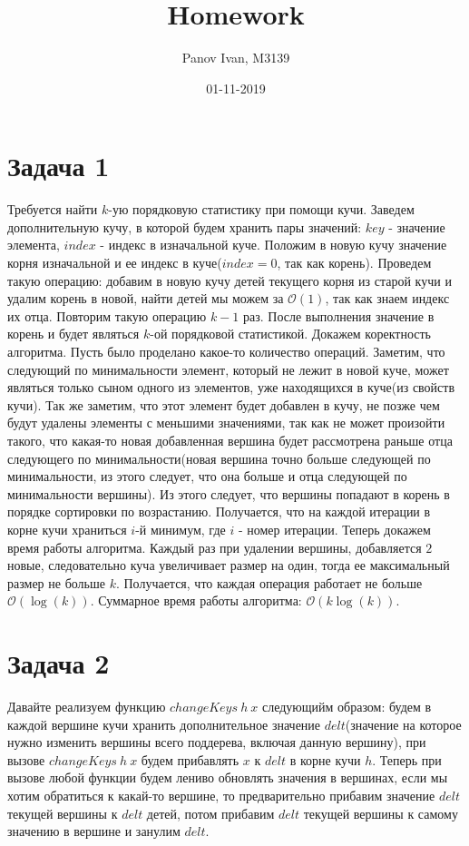 \documentclass{article}
\title{Homework}
\date{01-11-2019}
\author{Panov Ivan, M3139}
\begin{document}
	
	\maketitle
	\newpage
	
	\section*{Задача 1}
	Требуется найти $k$-ую порядковую статистику при помощи кучи. Заведем дополнительную кучу, в которой будем хранить пары значений: $key$ - значение элемента, $index$ - индекс в изначальной куче. Положим в новую кучу значение корня изначальной и ее индекс в куче($index = 0$, так как корень). Проведем такую операцию: добавим в новую кучу детей текущего корня из старой кучи и удалим корень в новой, найти детей мы можем за $\mathcal{O}(1)$, так как знаем индекс их отца. Повторим такую операцию $k - 1$ раз. После выполнения значение в корень и будет являться $k$-ой порядковой статистикой. Докажем коректность алгоритма. Пусть было проделано какое-то количество операций. Заметим, что следующий по минимальности элемент, который не лежит в новой куче, может являться только сыном одного из элементов, уже находящихся в куче(из свойств кучи). Так же заметим, что этот элемент будет добавлен в кучу, не позже чем будут удалены элементы с меньшими значениями, так как не может произойти такого, что какая-то новая добавленная вершина будет рассмотрена раньше отца следующего по минимальности(новая вершина точно больше следующей по минимальности, из этого следует, что она больше и отца следующей по минимальности вершины). Из этого следует, что вершины попадают в корень в порядке сортировки по возрастанию. Получается, что на каждой итерации в корне кучи храниться $i$-й минимум, где $i$ - номер итерации. Теперь докажем время работы алгоритма. Каждый раз при удалении вершины, добавляется $2$ новые, следовательно куча увеличивает размер на один, тогда ее максимальный размер не больше $k$. Получается, что каждая операция работает не больше $\mathcal{O}(\log(k))$. Суммарное время работы алгоритма: $\mathcal{O}(k\log(k))$.
	
	\section*{Задача 2}
	Давайте реализуем функцию $changeKeys\ h\ x$ следующийм образом: будем в каждой вершине кучи хранить дополнительное значение $delt$(значение на которое нужно изменить вершины всего поддерева, включая данную вершину), при вызове $changeKeys\ h\ x$ будем прибавлять $x$ к $delt$ в корне кучи $h$. Теперь при вызове любой функции будем лениво обновлять значения в вершинах, если мы хотим обратиться к какай-то вершине, то предварительно прибавим значение $delt$ текущей вершины к $delt$ детей, потом прибавим $delt$ текущей вершины к самому значению в вершине и занулим $delt$.
	
\end{document}

